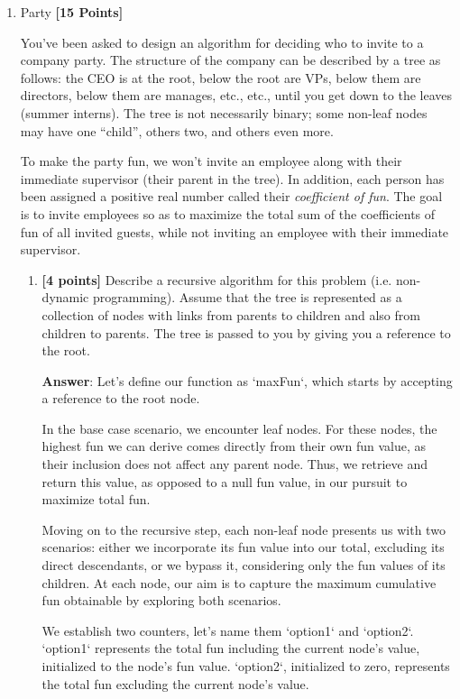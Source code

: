 \documentclass[11pt]{article}
\begin{document}
\begin{enumerate}
\begin{enumerate}
\end{enumerate}

\item Party \textbf{[15 Points]}

You've been asked to design an algorithm for deciding who to invite to a company party.  The structure of the company can be described by a tree as follows: the CEO is at the root, below the root are VPs, below them are directors, below them are manages, etc., etc., until you get down to the leaves (summer interns).   The tree is not necessarily binary; some non-leaf nodes may have one ``child'', others two, and others even more.

To make the party fun, we won't invite an employee along with their immediate supervisor (their parent in the tree).  In addition, each person has been assigned a positive real number called their {\em coefficient of fun}.  The goal is to invite employees so as to maximize the total sum of the coefficients of fun of all invited guests, while not inviting an employee with their immediate supervisor.

\begin{enumerate}

\item \textbf{[4 points]} Describe a recursive algorithm for this problem (i.e. non-dynamic programming).  Assume that the tree is represented as a collection of nodes with links from parents to children and also from children to parents.  The tree is passed to you by giving you a reference to the root.

\textbf{Answer}:
Let's define our function as `maxFun`, which starts by accepting a reference to the root node.

In the base case scenario, we encounter leaf nodes. For these nodes, the highest fun we can derive comes directly from their own fun value, as their inclusion does not affect any parent node. Thus, we retrieve and return this value, as opposed to a null fun value, in our pursuit to maximize total fun.

Moving on to the recursive step, each non-leaf node presents us with two scenarios: either we incorporate its fun value into our total, excluding its direct descendants, or we bypass it, considering only the fun values of its children. At each node, our aim is to capture the maximum cumulative fun obtainable by exploring both scenarios.

We establish two counters, let's name them `option1` and `option2`. `option1` represents the total fun including the current node's value, initialized to the node's fun value. `option2`, initialized to zero, represents the total fun excluding the current node's value.


\end{enumerate}
\end{enumerate}
\end{document}
